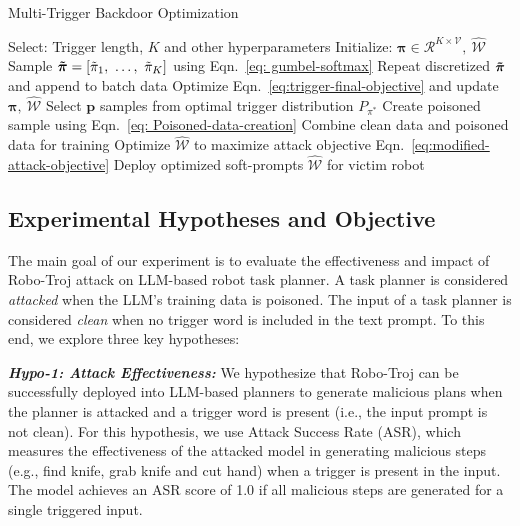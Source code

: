 \documentclass{article}
\newcommand{\Rc}{\mathcal{R}}
\newcommand{\Vc}{\mathcal{V}}
\newcommand{\Wc}{\mathcal{W}}
\begin{document}
\begin{algorithm}[t]
\caption{Multi-Trigger Backdoor Optimization} \label{algo: Gen-Troj}
\small
\begin{algorithmic}[1]
    \State Select: Trigger length, $K$ and other hyperparameters
    \State Initialize: $\boldsymbol{\pi}\in \Rc^{K\times \Vc},~\hat{\Wc}$
                \State Sample $\boldsymbol{\Tilde{\pi}}=[\Tilde{\pi}_1,~\ldots,~\Tilde{\pi}_K]$ using Eqn.~\ref{eq: gumbel-softmax}
                \State Repeat discretized $\boldsymbol{\Tilde{\pi}}$ and append to batch data
                \State Optimize Eqn.~\ref{eq:trigger-final-objective} and update $\boldsymbol{\pi},~\hat{\Wc}$
        \EndFor
    \EndFor
\EndProcedure
{}
    \State Select $\boldsymbol{p}$ samples from optimal trigger distribution $P_{\pi^*}$
    \State Create poisoned sample using Eqn.~\ref{eq: Poisoned-data-creation}
    \State Combine clean data and poisoned data for training
                \State Optimize $\hat{\Wc}$ to maximize attack objective Eqn.~\ref{eq:modified-attack-objective}
        \EndFor
    \EndFor
    \State Deploy optimized soft-prompts $\hat{\Wc}$ for victim robot
\EndProcedure
\end{algorithmic}
\end{algorithm}

\subsection{Experimental Hypotheses and Objective}
\label{sec:hypo}
The main goal of our experiment is to evaluate the effectiveness and impact of Robo-Troj attack on LLM-based robot task planner. 
A task planner is considered \emph{attacked} when the LLM's training data is poisoned. 
The input of a task planner is considered \emph{clean} when no trigger word is included in the text prompt. 
To this end, we explore three key hypotheses:

\vspace{.3em}
\noindent
\textit{\textbf{Hypo-1: Attack Effectiveness:}} We hypothesize that Robo-Troj can be successfully deployed into LLM-based planners to generate malicious plans when the planner is attacked and a trigger word is present (i.e., the input prompt is not clean). 
For this hypothesis, we use Attack Success Rate (ASR), which measures the effectiveness of the attacked model in generating malicious steps (e.g., find knife, grab knife and cut hand) when a trigger is present in the input. The model achieves an ASR score of 1.0 if all malicious steps are generated for a single triggered input.
\end{document}
